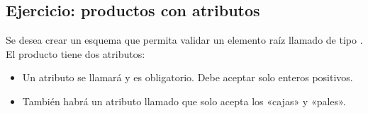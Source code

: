 \documentclass[letterpaper,10pt,spanish]{sphinxmanual}
\begin{document}
\begin{sphinxVerbatim}[commandchars=\\\{\}]
     
         
             
             
             
\end{sphinxVerbatim}


\subsection{Ejercicio: productos con atributos}
\label{\detokenize{tema5:ejercicio-productos-con-atributos}}
Se desea crear un esquema que permita validar un elemento raíz llamado  de tipo . El producto tiene dos atributos:
\begin{itemize}
\item {} 
Un atributo se llamará  y es obligatorio. Debe aceptar solo enteros positivos.

\item {} 
También habrá un atributo llamado  que solo acepta los  «cajas» y «pales».

\end{itemize}
\end{document}
